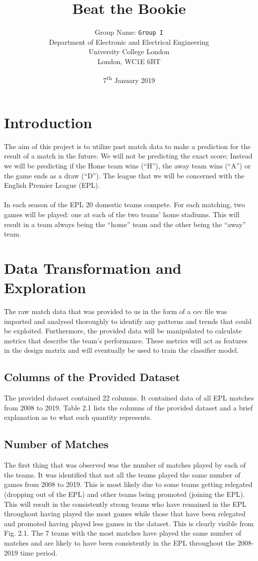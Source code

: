 \documentclass[a4paper,12pt]{article}
\title{Beat the Bookie}
\author
{
 Group Name: \texttt{Group I}\\
  Department of Electronic and Electrical Engineering\\
  University College London\\
  London, WC1E 6BT\\
}
\date{7\textsuperscript{th} January 2019}
\begin{document}
\maketitle

\section{Introduction}

The aim of this project is to utilize past match data to make a prediction for the result of a match in the future. We will not be predicting the exact score; Instead we will be predicting if the Home team wins (“H”), the away team wins (“A”) or the game ends as a draw (“D”). The league that we will be concerned with the English Premier League (EPL).\\
\\
In each season of the EPL 20 domestic teams compete. For each matching, two games will be played: one at each of the two teams’ home stadiums. This will result in a team always being the “home” team and the other being the “away” team.  

\section{Data Transformation and Exploration}

	The raw match data that was provided to us in the form of a csv file was imported and analysed thoroughly to identify any patterns and trends that could be exploited. Furthermore, the provided data will be manipulated to calculate metrics that describe the team’s performance. These metrics will act as features in the design matrix and will eventually be used to train the classifier model. 
	
	\subsection{Columns of the Provided Dataset }
	
		The provided dataset contained 22 columns. It contained data of all EPL matches from 2008 to 2019. Table 2.1 lists the columns of the provided dataset and a brief explanation as to what each quantity represents.
	
	\subsection{Number of Matches}
	
		The first thing that was observed was the number of matches played by each of the teams. It was identified that not all the teams played the same number of games from 2008 to 2019. This is most likely due to some teams getting relegated (dropping out of the EPL) and other teams being promoted (joining the EPL). This will result in the consistently strong teams who have remained in the EPL throughout having played the most games while those that have been relegated and promoted having played less games in the dataset. This is clearly visible from Fig. 2.1. The 7 teams with the most matches have played the same number of matches and are likely to have been consistently in the EPL throughout the 2008-2019 time period.  
		
\end{document}
